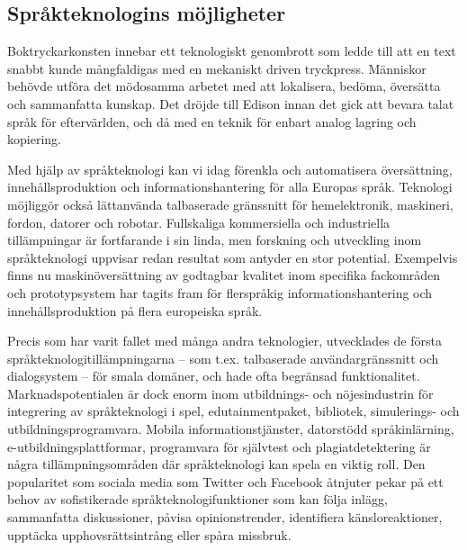 \begin{multicols}{2}
\subsection{Språkteknologins möjligheter}

Boktryckarkonsten innebar ett teknologiskt genombrott som ledde till
att en text snabbt kunde mångfaldigas med en mekaniskt driven
tryckpress. Människor behövde utföra det mödosamma arbetet med att
lokalisera, bedöma, översätta och sammanfatta kunskap. Det dröjde till
Edison innan det gick att bevara talat språk för eftervärlden, och då
med en teknik för enbart analog lagring och kopiering.

Med hjälp av språkteknologi kan vi idag förenkla och automatisera
översättning, innehållsproduktion och informationshantering för alla
Europas språk. Teknologi möjliggör också lättanvända talbaserade
gränssnitt för hemelektronik, maskineri, fordon, datorer och
robotar. Fullskaliga kommersiella och industriella tillämpningar är
fortfarande i sin linda, men forskning och utveckling inom
språkteknologi uppvisar redan resultat som antyder en stor
potential. Exempelvis finns nu maskinöversättning av godtagbar
kvalitet inom specifika fackområden och prototypsystem har tagits fram
för flerspråkig informationshantering och innehållsproduktion på flera
europeiska språk.


Precis som har varit fallet med många andra teknologier, utvecklades
de första språkteknologitillämpningarna -- som t.ex. talbaserade
användargränssnitt och dialogsystem -- för smala domäner, och hade
ofta begränsad funktionalitet. Marknadspotentialen är dock enorm inom
utbildnings- och nöjesindustrin för integrering av språkteknologi i
spel, edutainmentpaket, bibliotek, simulerings- och
utbildningsprogramvara. Mobila informationstjänster, datorstödd
språkinlärning, e-utbildningsplattformar, programvara för självtest
och plagiatdetektering är några tillämpningsområden där språkteknologi
kan spela en viktig roll. Den popularitet som sociala media som
Twitter och Facebook åtnjuter pekar på ett behov av sofistikerade
språkteknologifunktioner som kan följa inlägg, sammanfatta
diskussioner, påvisa opinionstrender, identifiera känsloreaktioner,
upptäcka upphovsrättsintrång eller spåra missbruk.


\end{multicols}
